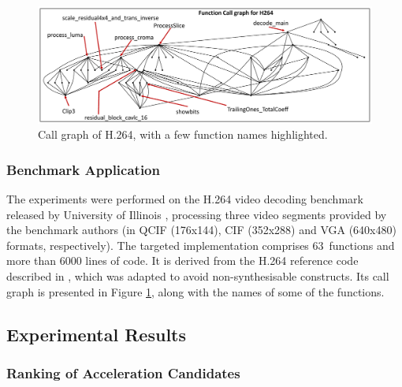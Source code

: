 \documentclass[]{usiinfthesis}
\newcommand{\numberOfcandidates}{{63}}
\begin{document}
\begin{figure}[t]
  \centering
  \includegraphics[width=1\linewidth]{figs/call_graph_w_no_names.pdf}
  \caption{Call graph of H.264, with a few function names
          highlighted.}
  \label{fig:call-graph-w-no-names}
\end{figure}

%
%
%
\subsubsection{Benchmark Application}

The experiments were performed on the H.264 video decoding benchmark released by 
University of Illinois \cite{LiuFeb16}, processing three video
segments provided by the benchmark authors (in QCIF (176x144), CIF (352x288) and
VGA (640x480) formats, respectively). The targeted implementation comprises \numberOfcandidates\ 
functions and more than 6000 lines of code. It is derived from the H.264
reference code described in \cite{H264May15}, which was adapted to
avoid non-synthesisable constructs. Its call graph is presented in Figure
\ref{fig:call-graph-w-no-names}, along with the names of some of the
functions. 


\subsection{Experimental Results}
\label{sec:results_as}

%
%
%
\subsubsection{Ranking of Acceleration Candidates} 
\end{document}
